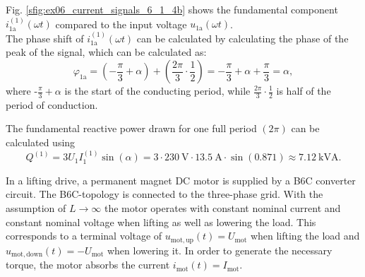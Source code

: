 \begin{solutionblock}
        Fig. \ref{sfig:ex06_current_signals_6_1_4b} shows the fundamental component $i^\mathrm{(1)}_\mathrm{1a}(\omega t)$ compared to the input voltage $u_\mathrm{1a}(\omega t)$.
        \\
        The phase shift of $i^\mathrm{(1)}_\mathrm{1a}(\omega t)$ can be calculated by calculating the phase of the peak of the signal, which can be calculated as: 
        \begin{equation}
            \varphi_\mathrm{1a} = (-\frac{\pi}{3} + \alpha) + (\frac{2\pi}{3} \cdot \frac{1}{2}) = -\frac{\pi}{3} + \alpha + \frac{\pi}{3} = \alpha,   
        \end{equation}
        where -$\frac{\pi}{3} + \alpha$ is the start of the conducting period, while $\frac{2\pi}{3} \cdot \frac{1}{2}$ is half of the period of conduction.
        

    \end{solutionblock}
    \begin{solutionblock}
        The fundamental reactive power drawn for one full period $(2\pi)$ can be calculated using
        \begin{equation}
            Q^\mathrm{(1)} = 3 U_1 I^\mathrm{(1)}_1 \sin(\alpha)  = 3 \cdot \SI{230}{\volt}  \cdot \SI{13.5}{\ampere} \cdot \sin(0.871) \approx \SI{7.12}{\kilo \volt \ampere}. 
        \end{equation}
    \end{solutionblock}

In a lifting drive, a permanent magnet DC motor is supplied by a B6C converter circuit. The B6C-topology is connected to the three-phase grid.
With the assumption of $L\rightarrow\infty$ the motor operates with constant nominal current and constant nominal voltage when lifting as well as lowering the load.
This corresponds to a terminal voltage of $u_\mathrm{mot,up}(t)=U_\mathrm{mot}$ when lifting the load and $u_\mathrm{mot,down}(t)=-U_\mathrm{mot}$ when lowering it.
In order to generate the necessary torque, the motor absorbs the current $i_\mathrm{mot}(t)=I_\mathrm{mot}$.



